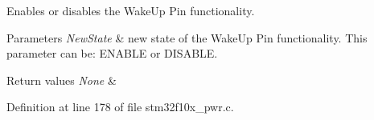 Enables or disables the Wake\+Up Pin functionality. 


\begin{DoxyParams}{Parameters}
{\em New\+State} & new state of the Wake\+Up Pin functionality. This parameter can be\+: E\+N\+A\+B\+LE or D\+I\+S\+A\+B\+LE. \\
\hline
\end{DoxyParams}

\begin{DoxyRetVals}{Return values}
{\em None} & \\
\hline
\end{DoxyRetVals}


Definition at line 178 of file stm32f10x\+\_\+pwr.\+c.

